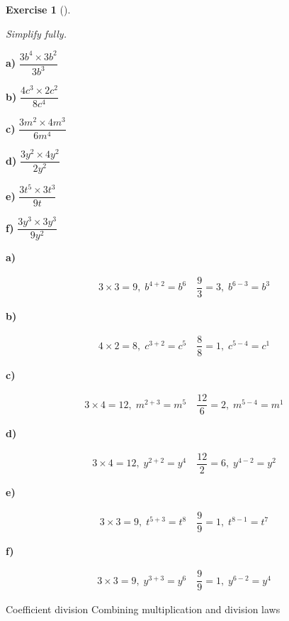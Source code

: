 \documentclass[
  letterpaper,
  DIV=11,
  numbers=noendperiod]{scrreprt}
\theoremstyle{definition}
\newtheorem{exercise}{Exercise}[chapter]
\theoremstyle{remark}
\begin{document}
\begin{exercise}[]\protect\hypertarget{exr-u2-23}{}\label{exr-u2-23}

\emph{Simplify fully.}

\textbf{a)} \(\displaystyle \dfrac{3b^{4} \times 3b^{2}}{3b^{3}}\)

\textbf{b)} \(\displaystyle \dfrac{4c^{3} \times 2c^{2}}{8c^{4}}\)

\textbf{c)} \(\displaystyle \dfrac{3m^{2} \times 4m^{3}}{6m^{4}}\)

\textbf{d)} \(\displaystyle \dfrac{3y^{2} \times 4y^{2}}{2y^{2}}\)

\textbf{e)} \(\displaystyle \dfrac{3t^{5} \times 3t^{3}}{9t}\)

\textbf{f)} \(\displaystyle \dfrac{3y^{3} \times 3y^{3}}{9y^{2}}\)

\begin{tcolorbox}[enhanced jigsaw, opacitybacktitle=0.6, coltitle=black, arc=.35mm, colframe=quarto-callout-tip-color-frame, colback=white, bottomrule=.15mm, left=2mm, colbacktitle=quarto-callout-tip-color!10!white, titlerule=0mm, opacityback=0, title=\textcolor{quarto-callout-tip-color}{\faLightbulb}\hspace{0.5em}{🔍 View Solutions}, leftrule=.75mm, breakable, rightrule=.15mm, bottomtitle=1mm, toptitle=1mm, toprule=.15mm]

\textbf{a)}

\[
\begin{aligned}
3\times 3=9,\;b^{4+2}=b^{6}\quad\dfrac{9}{3}=3,\;b^{6-3}=b^{3}
\end{aligned}
\]

\textbf{b)}

\[
\begin{aligned}
4\times 2=8,\;c^{3+2}=c^{5}\quad\dfrac{8}{8}=1,\;c^{5-4}=c^{1}
\end{aligned}
\]

\textbf{c)}

\[
\begin{aligned}
3\times 4=12,\;m^{2+3}=m^{5}\quad\dfrac{12}{6}=2,\;m^{5-4}=m^{1}
\end{aligned}
\]

\textbf{d)}

\[
\begin{aligned}
3\times 4=12,\;y^{2+2}=y^{4}\quad\dfrac{12}{2}=6,\;y^{4-2}=y^{2}
\end{aligned}
\]

\textbf{e)}

\[
\begin{aligned}
3\times 3=9,\;t^{5+3}=t^{8}\quad\dfrac{9}{9}=1,\;t^{8-1}=t^{7}
\end{aligned}
\]

\textbf{f)}

\[
\begin{aligned}
3\times 3=9,\;y^{3+3}=y^{6}\quad\dfrac{9}{9}=1,\;y^{6-2}=y^{4}
\end{aligned}
\]

\end{tcolorbox}

{Coefficient division} {Combining multiplication and division laws}

\end{exercise}
\end{document}
